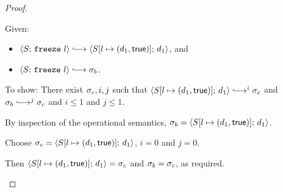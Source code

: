 \begin{proof}
\begin{itemize}
      Given:
      \begin{itemize}
      \item $\config{S}{\freeze{l}} \parstepsto \config{\extS{S}{l}{d_1}{\frozentrue}}{d_1}$, and
      \item $\config{S}{\freeze{l}} \parstepsto \conf_b$.
      \end{itemize}

      To show: There exist $\sigma_c, i, j$ such that
      $\config{\extS{S}{l}{d_1}{\frozentrue}}{d_1} \parstepsto^i
      \conf_c$ and $\conf_b \parstepsto^j \conf_c$ and $i \leq 1$ and
      $j \leq 1$.

      By inspection of the operational semantics, $\sigma_b =
      \langle S[l \mapsto (d_1, \textsf{true})];\, d_1 \rangle$.

      Choose $\sigma_c = \langle S[l \mapsto (d_1, \textsf{true})];\, d_1 \rangle$,
      $i = 0$ and $j = 0$.

      Then $\langle S[l \mapsto (d_1, \textsf{true})];\, d_1 \rangle = \sigma_c$ and
      $\sigma_b = \sigma_c$, as required.
  \end{itemize}
\end{proof}

